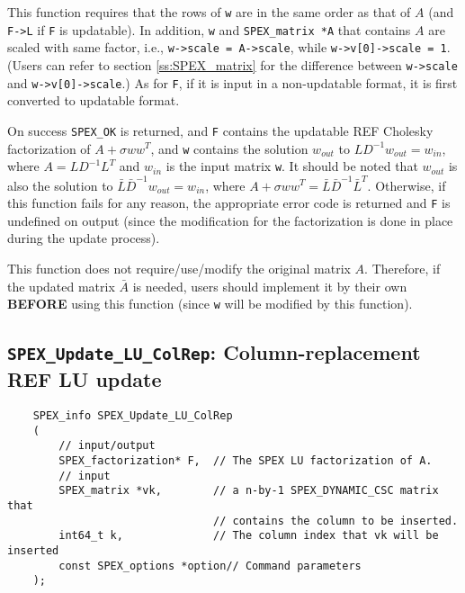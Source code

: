 \documentclass[12pt,oneside]{book}
\theoremstyle{definition}
\begin{document}
{This function requires that the rows of \verb|w| are in the same order as that of $A$ (and \verb|F->L| if \verb|F| is updatable). In addition, \verb|w| and \verb|SPEX_matrix *A| that contains $A$ are scaled with same factor, i.e., \verb|w->scale = A->scale|, while \verb|w->v[0]->scale = 1|. (Users can refer to section \ref{ss:SPEX_matrix} for the difference between \verb|w->scale| and \verb|w->v[0]->scale|.) As for \verb|F|, if it is input in a non-updatable format, it is first converted to updatable format. 

On success \verb|SPEX_OK| is returned, and \verb|F| contains the updatable REF Cholesky factorization of $A + \sigma w w^T$, and  \verb|w| contains the solution $w_{out}$ to $LD^{-1}w_{out} = w_{in}$, where $A=LD^{-1}L^T$ and $w_{in}$ is the input matrix \verb|w|. It should be noted that $w_{out}$ is also the solution to $\bar{L}\bar{D}^{-1}w_{out} = w_{in}$, where $A+ \sigma w w^T=\bar{L}\bar{D}^{-1}\bar{L}^T$. Otherwise, if this function fails for any reason, the appropriate error code is returned and \verb|F| is undefined on output (since the modification for the factorization is done in place during the update process).


This function does not require/use/modify the original matrix $A$. Therefore, if the updated matrix $\bar{A}$ is needed, users should implement it by their own {\bf BEFORE} using this function (since \verb|w| will be modified by this function). 


\subsection{\texttt{SPEX\_Update\_LU\_ColRep}: Column-replacement REF LU update}\label{ss:SPEX_Update_LU_ColRep}
\begin{mdframed}[userdefinedwidth=\textwidth]
{\footnotesize
\begin{verbatim}
    SPEX_info SPEX_Update_LU_ColRep
    (
        // input/output
        SPEX_factorization* F,  // The SPEX LU factorization of A.
        // input
        SPEX_matrix *vk,        // a n-by-1 SPEX_DYNAMIC_CSC matrix that
                                // contains the column to be inserted.
        int64_t k,              // The column index that vk will be inserted
        const SPEX_options *option// Command parameters
    );
\end{verbatim}
} \end{mdframed}

}
\end{document}
